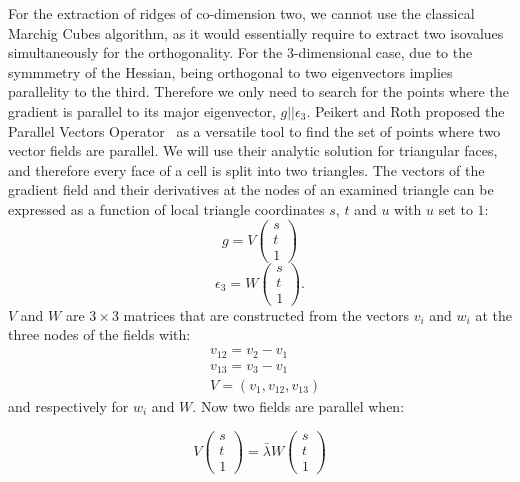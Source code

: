 For the extraction of ridges of co-dimension two, we cannot use the
classical Marchig Cubes algorithm, as it would essentially require to
extract two isovalues simultaneously for the orthogonality. For the
3-dimensional case, due to the symmmetry of the Hessian, being
orthogonal to two eigenvectors implies parallelity to the third.
Therefore we only need to search for the points where the gradient is
parallel to its major eigenvector, $g||\epsilon_3$. Peikert and Roth
proposed the Parallel Vectors Operator~\cite{PV} as a versatile tool to
find the set of points where two vector fields are parallel. We will use
their analytic solution for triangular faces, and therefore every face
of a cell is split into two triangles. The vectors of the gradient field
and their derivatives at the nodes of an examined triangle can be
expressed as a function of local triangle coordinates $s$, $t$ and $u$
with $u$ set to $1$:
\begin{equation}
  g = V
  \begin{pmatrix}
    s\\
    t\\
    1
  \end{pmatrix}
\end{equation}
\begin{equation}
  \epsilon_3 = W
  \begin{pmatrix}
    s\\
    t\\
    1
  \end{pmatrix}.
\end{equation}
\noindent $V$ and $W$ are $3 \times 3$ matrices that are constructed
from the vectors $v_i$ and $w_i$ at the three nodes of the fields with:
\begin{align}
  &v_{12} = v_2 - v_1\\
  &v_{13} = v_3 - v_1\\
  &V = (v_1, v_{12}, v_{13})
\end{align}
\noindent and respectively for $w_i$ and $W$. Now two fields are
parallel when:

\begin{equation}
  V
  \begin{pmatrix}
    s\\
    t\\
    1
  \end{pmatrix}
  = \bar{\lambda} W
  \begin{pmatrix}
    s\\
    t\\
    1
  \end{pmatrix}
\end{equation}

